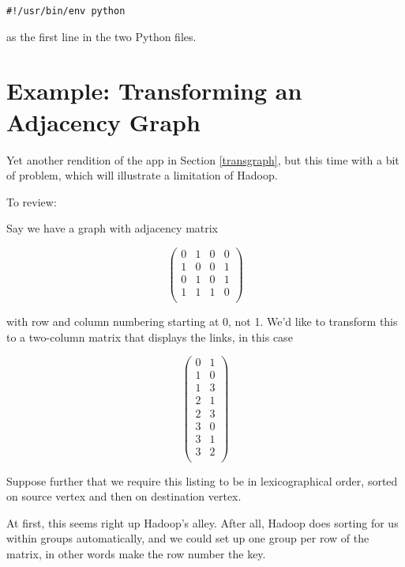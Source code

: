 \begin{lstlisting}
#!/usr/bin/env python
\end{lstlisting}

as the first line in the two Python files.

\section{Example:  Transforming an Adjacency Graph}

Yet another rendition of the app in Section \ref{transgraph}, but this
time with a bit of problem, which will illustrate a limitation of
Hadoop.  

To review:

Say we have a graph with adjacency matrix

\begin{equation}
\left (
\begin{array}{rrrr}
0 & 1 & 0 & 0 \\
1 & 0 & 0 & 1 \\
0 & 1 & 0 & 1 \\
1 & 1 & 1 & 0 \\
\end{array}
\right )
\end{equation}

with row and column numbering starting at 0, not 1.  We'd like to
transform this to a two-column matrix that displays the links, in this
case

\begin{equation}
\left (
\begin{array}{rr}
0 & 1 \\
1 & 0 \\
1 & 3 \\
2 & 1 \\
2 & 3 \\
3 & 0 \\
3 & 1 \\
3 & 2 \\
\end{array}
\right )
\end{equation}

Suppose further that we require this listing to be in lexicographical
order, sorted on source vertex and then on destination vertex.  

At first, this seems right up Hadoop's alley.  After all, Hadoop does
sorting for us within groups automatically, and we could set up one
group per row of the matrix, in other words make the row number the key.

